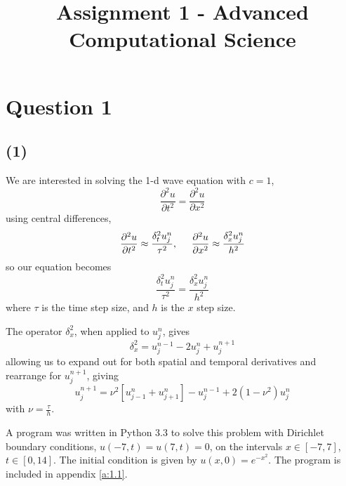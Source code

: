 \documentclass[10pt]{article}
\title{Assignment 1 - Advanced Computational Science}
\newcommand{\ujn}{u_{j}^{n}}
\newcommand{\ujpn}{u_{j+1}^{n}}
\newcommand{\ujmn}{u_{j-1}^{n}}
\newcommand{\ujnp}{u_{j}^{n+1}}
\newcommand{\ujnm}{u_{j}^{n-1}}
\begin{document}
\maketitle

\section*{Question 1}
\subsection*{(1)}
We are interested in solving the 1-d wave equation with $c=1$,
\begin{equation}
\frac{\partial^2 u}{\partial t^2} = \frac{\partial^2 u}{\partial x^2}
\label{e:we}
\end{equation}
using central differences,
\begin{equation}
\frac{\partial^2 u}{\partial t^2} \approx \frac{\delta_t^2 \ujn}{\tau^2},
\hspace{5mm}
\frac{\partial^2 u}{\partial x^2} \approx \frac{\delta_x^2 \ujn}{h^2}
\label{e:central}
\end{equation}
so our equation becomes
\begin{equation}
\frac{\delta_t^2 \ujn}{\tau^2} = \frac{\delta_x^2 \ujn}{h^2}
\label{e:wecd}
\end{equation}
where $\tau$ is the time step size, and $h$ is the $x$ step size.

The operator $\delta_x ^2$, when applied to $\ujn$, gives
$$
\delta_x^2 = \ujnm - 2\ujn + \ujnp
$$
allowing us to expand out for both spatial and temporal derivatives and rearrange
for $\ujnp$, giving
\begin{equation}
\ujnp = \nu^2 \left[\ujmn + \ujpn \right] - \ujnm + 2(1 - \nu^2)\ujn
\label{e:cd}
\end{equation}
with $\nu = \frac{\tau}{h}$.

A program was written in Python 3.3 to solve this problem with Dirichlet boundary
conditions, $u(-7,t) = u(7,t) = 0$, on the intervals $x \in \left[-7,7\right]$,
$t \in \left[0,14\right] $. The initial condition is given by
$u(x,0) = e^{-x^2}$.
The program is included in appendix \ref{a:1.1}.
\end{document}
